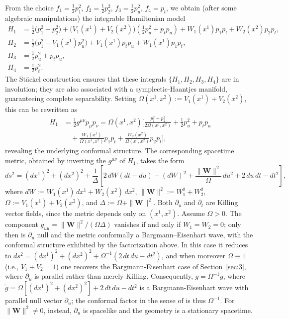 \documentclass[10pt]{amsart}
\numberwithin{equation}{section}
\theoremstyle{definition}
\begin{document}
	From the choice $f_1= \frac{1}{2}p_1^2$, $f_2=\frac{1}{2}p_2^2$, $f_3= \frac{1}{2}p_u^2$, $f_4= p_t$, we obtain (after some algebraic manipulations) the integrable Hamiltonian model
\begin{equation}
	\begin{split}
		H_1 &= \frac{1}{2}\big(p_1^2+p_2^2\big) +\big(V_1(x^1)+V_2(x^2) \big) \left( \frac{1}{2}p_u^2 + p_t p_u\right) + W_1(x^1) p_1 p_t + W_2(x^2) p_2 p_t, \\
		H_2 &= \frac{1}{2} \big(p_1^2 + V_1(x^1) p_{u}^2\big) + V_1(x^1) p_t p_u + W_1(x^1) p_1 p_t, \\
		H_3 &= \frac{1}{2} p_{u}^2+ p_t p_u, \\
		H_4 &= \frac{1}{2} p_t^2.
	\end{split}
\end{equation}
The Stäckel construction ensures that these integrals $\{H_1, H_2, H_3, H_4\}$ are in involution; they are also associated with a symplectic-Haantjes manifold, guaranteeing complete separability.
Setting $\Omega(x^1,x^2) := V_1(x^1)+V_2(x^2)$, this can be rewritten as
\begin{equation}
	\begin{split}
		H_1 &= \frac{1}{2}g^{\mu\nu}p_\mu p_\nu=\Omega(x^1,x^2) \Bigg[\frac{p_1^2+p_2^2}{2\Omega(x^1,x^2)} +\frac{1}{2} p_u^2 +p_t p_u \\
		&\quad + \frac{W_1(x^1)}{\Omega(x^1,x^2)} p_1 p_t + \frac{W_2(x^2)}{\Omega(x^1,x^2)} p_2 p_t \Bigg],
	\end{split}
\end{equation}
revealing the underlying conformal structure. The corresponding spacetime metric, obtained by inverting the $g^{\mu\nu}$ of $H_1$, takes the form
\begin{equation}
	ds^2 = (dx^1)^2 + (dx^2)^2 + \frac{1}{\Delta}\left[ 2\,dW(dt - du) - (dW)^2 + \frac{\|\boldsymbol{W}\|^2}{\Omega}\,du^2 + 2\,du\,dt - dt^2 \right],
\end{equation}
where $dW := W_1(x^1)\,dx^1 + W_2(x^2)\,dx^2$, $\|\boldsymbol{W}\|^2 := W_1^2 + W_2^2$, $\Omega := V_1(x^1) + V_2(x^2)$, and $\Delta := \Omega + \|\boldsymbol{W}\|^2$. Both $\partial_u$ and $\partial_t$ are Killing vector fields, since the metric depends only on $(x^1,x^2)$. Assume $\Omega >0$. The component $g_{uu} = \|\boldsymbol{W}\|^2/(\Omega\Delta)$ vanishes if and only if $W_1 = W_2 = 0$; only then is $\partial_u$ null and the metric conformally a Bargmann–Eisenhart wave, with the conformal structure exhibited by the factorization above. In this case it reduces to $ds^2 = (dx^1)^2 + (dx^2)^2 + \Omega^{-1}(2\,dt\,du - dt^2)$, and when moreover $\Omega \equiv 1$ (i.e., $V_1 + V_2 = 1$) one recovers the Bargmann-Eisenhart case of Section~\ref{sec:3}, where $\partial_u$ is parallel rather than merely Killing. Consequently, $g = \Omega^{-1}\tilde{g}$, where $\tilde{g} = \Omega\left[(dx^1)^2+(dx^2)^2\right] + 2\,dt\,du - dt^2$ is a Bargmann-Eisenhart wave with parallel null vector $\partial_u$; the conformal factor in the sense of \cite[Def.~4.11]{BM2013PRD} is thus $\Omega^{-1}$. For $\|\boldsymbol{W}\|^2 \neq 0$,  instead, $\partial_u$ is spacelike and the geometry is a stationary spacetime.
\end{document}
